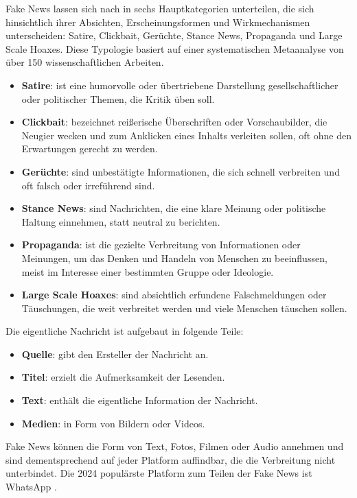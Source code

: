 Fake News lassen sich nach \cite{Sharma:2024} in sechs Hauptkategorien unterteilen, die sich hinsichtlich ihrer Absichten, Erscheinungsformen und Wirkmechanismen unterscheiden: 
Satire, Clickbait, Gerüchte, Stance News, Propaganda und Large Scale Hoaxes.
Diese Typologie basiert auf einer systematischen Metaanalyse von über 150 wissenschaftlichen Arbeiten.

\begin{itemize}
    \item \textbf{Satire}: ist eine humorvolle oder übertriebene Darstellung gesellschaftlicher oder politischer Themen, die Kritik üben soll.
    \item \textbf{Clickbait}: bezeichnet reißerische Überschriften oder Vorschaubilder, die Neugier wecken und zum Anklicken eines Inhalts verleiten sollen, oft ohne den Erwartungen gerecht zu werden.
    \item \textbf{Gerüchte}: sind unbestätigte Informationen, die sich schnell verbreiten und oft falsch oder irreführend sind.
    \item \textbf{Stance News}: sind Nachrichten, die eine klare Meinung oder politische Haltung einnehmen, statt neutral zu berichten.
    \item \textbf{Propaganda}: ist die gezielte Verbreitung von Informationen oder Meinungen, um das Denken und Handeln von Menschen zu beeinflussen, meist im Interesse einer bestimmten Gruppe oder Ideologie.
    \item \textbf{Large Scale Hoaxes}: sind absichtlich erfundene Falschmeldungen oder Täuschungen, die weit verbreitet werden und viele Menschen täuschen sollen.
\end{itemize}

Die eigentliche Nachricht ist aufgebaut in folgende Teile:

\begin{itemize}
    \item \textbf{Quelle}: gibt den Ersteller der Nachricht an.
    \item \textbf{Titel}: erzielt die Aufmerksamkeit der Lesenden.
    \item \textbf{Text}: enthält die eigentliche Information der Nachricht.
    \item \textbf{Medien}: in Form von Bildern oder Videos.
\end{itemize}

Fake News können die Form von Text, Fotos, Filmen oder Audio annehmen und sind dementsprechend auf jeder Platform auffindbar, 
die die Verbreitung nicht unterbindet. Die 2024 populärste Platform zum Teilen der Fake News ist WhatsApp \cite{Ashish2024}.

